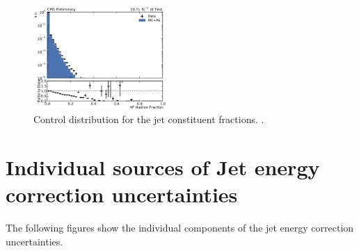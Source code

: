 \begin{figure}[htbp]
    \includegraphics[width=0.45\textwidth]{figures/measurement/jetprop_hf_emf_default.pdf}
    \caption{Control distribution for the jet constituent fractions. .}
    \label{fig:controlplots:properties}
\end{figure}


\section{Individual sources of Jet energy correction uncertainties}

The following figures show the individual components of the jet energy correction uncertainties.

